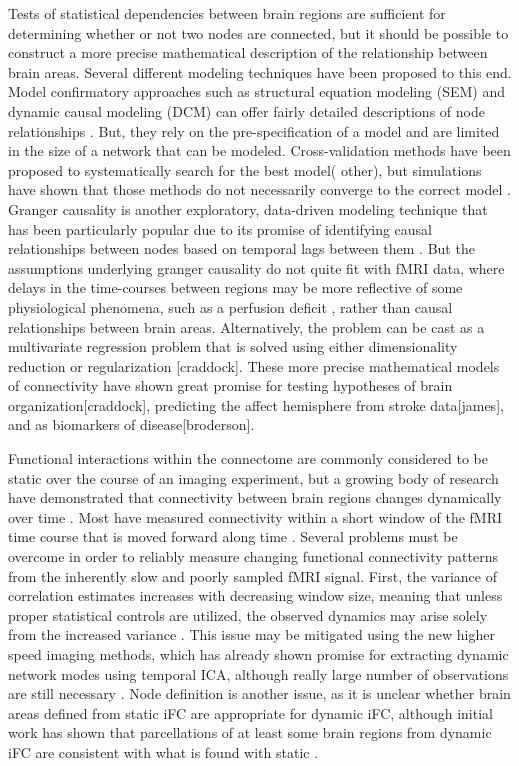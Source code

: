 Tests of statistical dependencies between brain regions are sufficient for determining whether or not two nodes are connected, but it should be possible to construct a more precise mathematical description of the relationship between brain areas. Several different modeling techniques have been proposed to this end. Model confirmatory approaches such as structural equation modeling (SEM) and dynamic causal modeling (DCM) can offer fairly detailed descriptions of node relationships . But, they rely on the pre-specification of a model and are limited in the size of a network that can be modeled. Cross-validation methods have been proposed to systematically search for the best model(\cite{GAJames} other), but simulations have shown that those methods do not necessarily converge to the correct model \cite{lohman}. Granger causality is another exploratory, data-driven modeling technique that has been particularly popular due to its promise of identifying causal relationships between nodes based on temporal lags between them \cite{}. But the assumptions underlying granger causality do not quite fit with fMRI data, where delays in the time-courses between regions may be more reflective of some physiological phenomena, such as a perfusion deficit \cite{Lv}, rather than causal relationships between brain areas. Alternatively, the problem can be cast as a multivariate regression problem that is solved using either dimensionality reduction or regularization [craddock]. These more precise mathematical models of connectivity have shown great promise for testing hypotheses of brain organization[craddock], predicting the affect hemisphere from stroke data[james], and as biomarkers of disease[broderson].

Functional interactions within the connectome are commonly considered to be static over the course of an imaging experiment, but a growing body of research have demonstrated that connectivity between brain regions changes dynamically over time \cite{Chang, Keilholz,Hutchinson2013, Fu2013, Zhen}. Most have measured connectivity within a short window of the fMRI time course that is moved forward along time \cite{}. Several problems must be overcome in order to reliably measure changing functional connectivity patterns from the inherently slow and poorly sampled fMRI signal. First, the variance of correlation estimates increases with decreasing window size, meaning that unless proper statistical controls are utilized, the observed dynamics may arise solely from the increased variance \cite{}. This issue may be mitigated using the new higher speed imaging methods, which has already shown promise for extracting dynamic network modes using temporal ICA, although really large number of observations are still necessary \cite{Smith2012}. Node definition is another issue, as it is unclear whether brain areas defined from static iFC are appropriate for dynamic iFC, although initial work has shown that parcellations of at least some brain regions from dynamic iFC are consistent with what is found with static \cite{Yang2013}.

